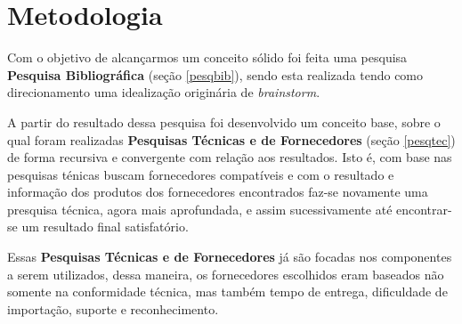 


\section{Metodologia}

Com o objetivo de alcançarmos um conceito sólido foi feita uma pesquisa
\textbf{Pesquisa Bibliográfica} (seção \ref{pesqbib}), sendo esta realizada
tendo como direcionamento uma idealização originária de \emph{brainstorm}.

A partir do resultado dessa pesquisa foi desenvolvido um conceito base, sobre o
qual foram realizadas \textbf{Pesquisas Técnicas e de Fornecedores} (seção
\ref{pesqtec}) de forma recursiva e convergente com relação aos resultados. Isto
é, com base nas pesquisas ténicas buscam fornecedores compatíveis e com o
resultado e informação dos produtos dos fornecedores encontrados faz-se
novamente uma presquisa técnica, agora mais aprofundada, e assim sucessivamente
até encontrar-se um resultado final satisfatório.

Essas  \textbf{Pesquisas Técnicas e de Fornecedores} já são focadas nos
componentes a serem utilizados, dessa maneira, os fornecedores escolhidos eram
baseados não somente na conformidade técnica, mas também tempo de entrega,
dificuldade de importação, suporte e reconhecimento.




